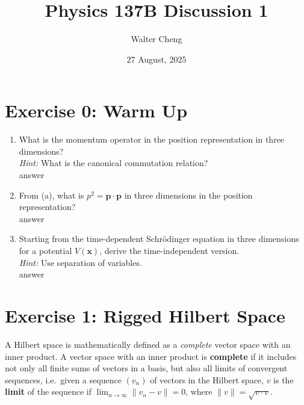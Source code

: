 \documentclass[11pt]{article}
\title{Physics 137B Discussion 1}
\author{Walter Cheng}
\date{27 August, 2025}
\begin{document}
\maketitle

\section*{Exercise 0: Warm Up}
\begin{enumerate}[label=\alph*)]
	\item What is the momentum operator in the position representation in three dimensions?\\
		\textit{Hint:} What is the canonical commutation relation?\\

		answer
 
	\item From (a), what is $p^2 = \mathbf{p \cdot p}$ in three dimensions in the position representation?\\
		
		answer
	
	\item Starting from the time-dependent Schrödinger equation in three dimensions for a potential $V(\mathbf{x})$, derive the time-independent version.\\
		\textit{Hint:} Use separation of variables.\\

		answer

\end{enumerate}


\section*{Exercise 1: Rigged Hilbert Space}
A Hilbert space is mathematically defined as a \textit{complete} vector space with an inner product. A vector space with an inner product is \textbf{complete} if it includes not only all finite sums of vectors in a basis, but also all limits of convergent sequences, i.e.\ given a sequence $(v_n)$ of vectors in the Hilbert space, $v$ is the \textbf{limit} of the sequence if $\lim_{n\to\infty}\|v_n - v\| = 0$, where $\|v\| = \sqrt{v \cdot v}$.
\end{document}
